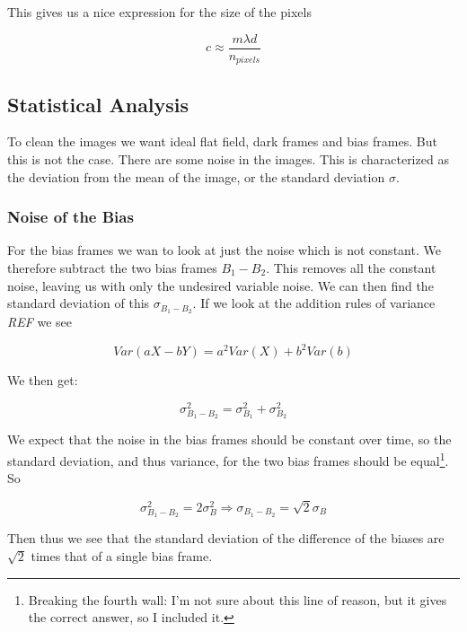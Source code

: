 \documentclass{emulateapj}
\begin{document}
This gives us a nice expression for the size of the pixels

\begin{equation}
c \approx \frac{m\lambda d}{n_{pixels}}
\label{eq:pixelSize}
\end{equation}



\subsection{Statistical Analysis}
To clean the images we want ideal flat field, dark frames and bias frames. But this is not the case. There are some noise in the images. This is characterized as the deviation from the mean of the image, or the standard deviation $\sigma$.

\subsubsection{Noise of the Bias}
\label{sec:noiseBias}
For the bias frames we wan to look at just the noise which is not constant. We therefore subtract the two bias frames $B_1 - B_2$. This removes all the constant noise, leaving us with only the undesired variable noise. We can then find the standard deviation of this $\sigma_{B_1 - B_2}$. If we look at the addition rules of variance \emph{REF} we see

\begin{equation}
Var(aX - bY) = a^2Var(X) + b^2Var(b)
\end{equation}

We then get:

\begin{equation}
\sigma_{B_1 - B_2}^2 = \sigma_{B_1}^2 + \sigma_{B_2}^2
\end{equation}

We expect that the noise in the bias frames should be constant over time, so the standard deviation, and thus variance, for the two bias frames should be equal\footnote{Breaking the fourth wall: I'm not sure about this line of reason, but it gives the correct answer, so I included it.}. So

\begin{equation}
\sigma_{B_1 - B_2}^2 = 2\sigma_{B}^2 \Rightarrow \sigma_{B_1 - B_2} = \sqrt{2}\sigma_B
\label{eq:stdB1B2}
\end{equation}

Then thus we see that the standard deviation of the difference of the biases are $\sqrt{2}$ times that of a single bias frame.
\end{document}
